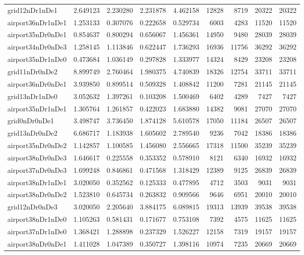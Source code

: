 \begin{longtable}{|l|r|r|r|r|r|r|r|r|}
grid12nDr1nDe1 & 2.649123 & 2.230280 & 2.231878 & 4.462158 & 12828 & 8719 & 20322 & 20322 \\
airport36nDr1nDe1 & 1.253133 & 0.307076 & 0.222658 & 0.529734 & 6003 & 4283 & 11520 & 11520 \\
airport35nDr0nDe1 & 0.854637 & 0.800294 & 0.656067 & 1.456361 & 14950 & 9480 & 28039 & 28039 \\
airport34nDr0nDe3 & 1.258145 & 1.113846 & 0.622447 & 1.736293 & 16936 & 11756 & 36292 & 36292 \\
airport35nDr1nDe0 & 0.473684 & 1.036149 & 0.297828 & 1.333977 & 14324 & 8429 & 23208 & 23208 \\
grid11nDr0nDe2 & 8.899749 & 2.760464 & 1.980375 & 4.740839 & 18326 & 12754 & 33711 & 33711 \\
airport36nDr0nDe1 & 3.939850 & 0.899514 & 0.509328 & 1.408842 & 11200 & 7281 & 21145 & 21145 \\
grid13nDr1nDe0 & 3.052632 & 1.397261 & 0.103208 & 1.500469 & 6402 & 4289 & 7427 & 7427 \\
airport35nDr1nDe1 & 1.305764 & 1.261857 & 0.422023 & 1.683880 & 14382 & 9081 & 27070 & 27070 \\
grid0nDr0nDe1 & 3.498747 & 3.736450 & 1.874128 & 5.610578 & 17050 & 11184 & 26507 & 26507 \\
grid13nDr0nDe2 & 6.686717 & 1.183938 & 1.605602 & 2.789540 & 9236 & 7042 & 18386 & 18386 \\
airport35nDr0nDe2 & 1.142857 & 1.100585 & 1.456080 & 2.556665 & 17318 & 11500 & 35239 & 35239 \\
airport38nDr0nDe3 & 1.646617 & 0.225558 & 0.353352 & 0.578910 & 8121 & 6340 & 16932 & 16932 \\
airport37nDr0nDe3 & 1.699248 & 0.846861 & 0.471568 & 1.318429 & 12389 & 9125 & 26839 & 26839 \\
airport38nDr1nDe1 & 3.020050 & 0.352562 & 0.125333 & 0.477895 & 4712 & 3503 & 9031 & 9031 \\
airport38nDr0nDe2 & 1.523810 & 0.645734 & 0.263832 & 0.909566 & 9646 & 6951 & 20010 & 20010 \\
grid12nDr0nDe3 & 3.020050 & 2.205640 & 3.884175 & 6.089815 & 19313 & 13939 & 39538 & 39538 \\
airport38nDr1nDe0 & 1.105263 & 0.581431 & 0.171677 & 0.753108 & 7392 & 4575 & 11625 & 11625 \\
airport37nDr1nDe0 & 1.368421 & 1.288898 & 0.237329 & 1.526227 & 12158 & 7319 & 19157 & 19157 \\
airport38nDr0nDe1 & 1.411028 & 1.047389 & 0.350727 & 1.398116 & 10974 & 7235 & 20669 & 20669 \\

\end{longtable}
